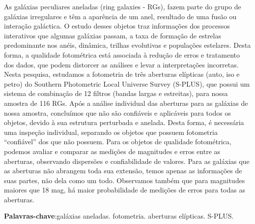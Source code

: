 \setlength{\absparsep}{18pt} %
\begin{resumo}
 
As galáxias peculiares aneladas (ring galaxies - RGs), fazem parte do grupo de galáxias irregulares e têm a aparência de um anel, resultado de uma fusão ou interação galáctica. O estudo desses objetos traz informações dos processos interativos que algumas galáxias passam, a taxa de formação de estrelas predominante nos anéis, dinâmica, trilhas evolutivas e populações estelares. Desta forma, a qualidade fotométrica está associada à redução de erros e tratamento dos dados, que podem distorcer as análises e levar a interpretações incorretas. Nesta pesquisa, estudamos a fotometria de três aberturas elípticas (auto, iso e petro) do Southern Photometric Local Universe Survey (S-PLUS), que possui um sistema de combinação de 12 filtros (bandas largas e estreitas), para nossa amostra de 116 RGs. Após a análise individual das aberturas para as galáxias de nossa amostra, concluímos que não são confiáveis e aplicáveis para todos os objetos, devido à sua estrutura perturbada e anelada. Desta forma, é necessária uma inspeção individual, separando os objetos que possuem fotometria ``confiável'' dos que não possuem. Para os objetos de qualidade fotométrica, podemos avaliar e comparar as medições de magnitudes e erros entre as aberturas, observando dispersões e confiabilidade de valores. Para as galáxias que as aberturas não abrangem toda sua extensão, temos apenas as informações de suas partes, não dela como um todo. Observamos também que para magnitudes maiores que 18 mag, há maior probabilidade de medições de erros para todas as aberturas.

 \textbf{Palavras-chave}:galáxias aneladas. fotometria. aberturas elípticas. S-PLUS.
\end{resumo}
